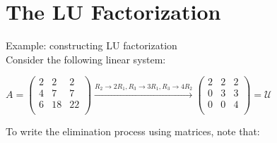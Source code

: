 \documentclass[UTF8,a4paper, 10pt, openany]{book}
\begin{document}
\section{The LU Factorization}
Example: constructing LU factorization\\
Consider the following linear system:
\begin{center}
$A=
\begin{pmatrix}
2 & 2 & 2 \\
4 & 7 & 7 \\
6 & 18 & 22 \\
\end{pmatrix}
\xrightarrow[]{R_2\rightarrow 2R_1, R_3\rightarrow 3R_1, R_3\rightarrow 4R_2}
\begin{pmatrix}
2 & 2 & 2 \\
0 & 3 & 3 \\
0 & 0 & 4 \\
\end{pmatrix}=\mathcal{U}$
\end{center}
To write the elimination process using matrices, note that:
\end{document}
